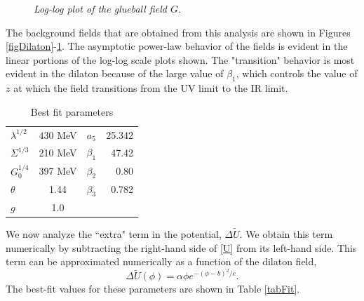 \documentclass[12pt]{article}
\newcommand{\be}{\begin{equation}}
\newcommand{\ee}{\end{equation}}
\begin{document}
\begin{figure}[htb]
\caption{\textit{Log-log plot of the glueball field $G$.}}
\label{figGlueball}
\end{figure}

The background fields that are obtained from this analysis are shown in Figures \ref{figDilaton}-\ref{figGlueball}. The asymptotic power-law behavior of the fields is evident in the linear portions of the log-log scale plots shown. The "transition" behavior is most evident in the dilaton because of the large value of $\beta_1$, which controls the value of $z$ at which the field transitions from the UV limit to the IR limit. 

\begin{table}[htb]
\begin{center}
\begin{tabular}{| l | c || c | r | }
\hline
  $\lambda^{1/2}$ & $430$ MeV & $a_5$ & 25.342 \\
  $\Sigma^{1/3}$ &  210 MeV & $\beta_1$ & 47.42\\
  $G_0^{1/4}$ & 397 MeV &  $\beta_2$ & 0.80 \\
 $ \theta $& 1.44 & $\beta_3$ & 0.782 \\
  $g $& 1.0 & & \\
  \hline
\end{tabular}
\caption{Best fit parameters}
\label{tabParam}
\end{center}
\end{table}


We now analyze the ``extra" term in the potential, $\Delta \tilde{U}$. 
We obtain this term numerically by subtracting the right-hand side of \ref{U} from its left-hand side.
This term can be approximated numerically as a function of the dilaton field, 
\be
\Delta \tilde{U}\left(\phi\right) = \alpha \phi e^{-\left(\phi-b\right)^2/c } .
\ee
The best-fit values for these parameters are shown in Table \ref{tabFit}.
\end{document}
